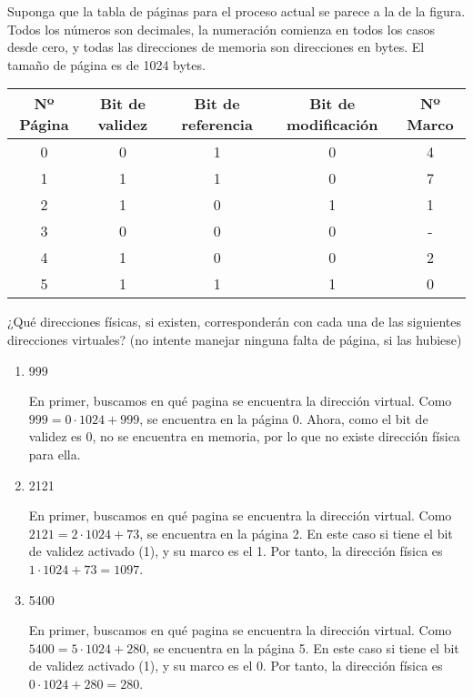 \begin{ejercicio}
Suponga que la tabla de páginas para el proceso actual se parece a la de la figura. Todos los números son decimales, la numeración comienza en todos los casos desde cero, y todas las direcciones de memoria son direcciones en bytes. El tamaño de página es de 1024 bytes.

\begin{center}
    \begin{tabular}{|c|c|c|c|c|}
    \hline
    Nº Página & Bit de validez & Bit de referencia & Bit de modificación & Nº Marco \\
    \hline
    0 & 0 & 1 & 0 & 4 \\
    1 & 1 & 1 & 0 & 7 \\
    2 & 1 & 0 & 1 & 1 \\
    3 & 0 & 0 & 0 & - \\
    4 & 1 & 0 & 0 & 2 \\
    5 & 1 & 1 & 1 & 0 \\
    \hline
    \end{tabular}
    \end{center}

    ¿Qué direcciones físicas, si existen, corresponderán con cada una de las siguientes direcciones virtuales? (no intente manejar ninguna falta de página, si las hubiese)
    \begin{enumerate}
        \item 999
        
        En primer, buscamos en qué pagina se encuentra la dirección virtual. Como $999=0\cdot 1024 + 999$, se encuentra en la página 0.
        Ahora, como el bit de validez es 0, no se encuentra en memoria, por lo que no existe dirección física para ella.
        
        \item 2121
        
        En primer, buscamos en qué pagina se encuentra la dirección virtual. Como $2121=2\cdot 1024 + 73$, se encuentra en la página 2.
        En este caso si tiene el bit de validez activado (1), y su marco es el 1.
        Por tanto, la dirección física es $1\cdot 1024 + 73 = 1097$.

        \item 5400
        
        En primer, buscamos en qué pagina se encuentra la dirección virtual. Como $5400=5\cdot 1024 + 280$, se encuentra en la página 5.
        En este caso si tiene el bit de validez activado (1), y su marco es el 0.
        Por tanto, la dirección física es $0\cdot 1024 + 280 = 280$.
    \end{enumerate}
\end{ejercicio}

